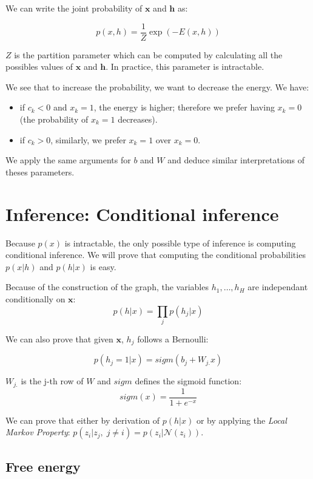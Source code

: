 \documentclass{article}
\begin{document}
We can write the joint probability of $ \mathbf{x} $ and $ \mathbf{h} $ as: 

\[ p(x,h) = \frac{1}{Z} \exp(-E(x,h)) \]

$Z$ is the partition parameter which can be computed by calculating all the possibles values of $ \mathbf{x} $  and $ \mathbf{h} $. In practice, this parameter is intractable.

We see that to increase the probability, we want to decrease the energy. We have:
 
\begin{itemize}
    \item if $c_k < 0$ and $x_k = 1$, the energy is higher; therefore we prefer having $x_k = 0$ (the probability of $x_k = 1$ decreases).
    \item if $c_k > 0$, similarly, we prefer $x_k = 1$ over $x_k = 0$.
\end{itemize}

We apply the same arguments for $b$ and $W$ and deduce similar interpretations of theses parameters.


\section{Inference: Conditional inference}

Because $p(x)$ is intractable, the only possible type of inference is computing conditional inference. We will prove that computing the conditional probabilities $p(x|h)$ and $p(h|x)$ is easy.

Because of the construction of the graph, the variables $h_1, \hdots, h_H$ are independant conditionally on $\mathbf{x}$: \[p(h|x) = \prod_j p(h_j|x)\]

We can also prove that given $\mathbf{x}$, $h_j$ follows a Bernoulli:

\[ p(h_j=1|x) = sigm(b_j + W_{j.}x)\]

$ W_{j.}$ is the j-th row of $W$ and $sigm$ defines the sigmoid function: $$sigm(x) = \frac{1}{1+e^{-x}}$$

We can prove that either by derivation of  $p(h|x)$ or by applying the \emph{Local Markov Property}: $p(z_i|z_j, \; j \neq i) =  p(z_i|\mathcal{N}(z_i))$.

\subsection{Free energy}
\end{document}
